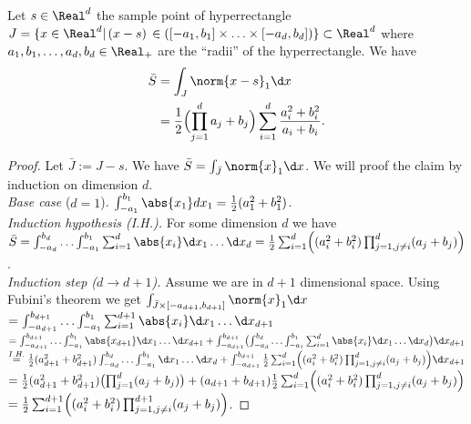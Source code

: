 \begin{lem} \label{lem:defint_of_1norm}
Let $s \in \Real^d$ the sample point of hyperrectangle $J = \{ x \in \Real^d \vert \,(x-s)\, \in ([-a_1,b_1] \times \ldots \times [-a_d,b_d])\}\subset \Real^d$ where $a_1,b_1,\ldots,a_d,b_d \in \Real_+$ are the ``radii'' of the hyperrectangle.
We have 
\begin{align}
\bar S  &= \int_{J} \norm{x-s}_1 \d x \\
& =  \frac{1}{2} \Bigl( \prod_{j=1}^d a_j + b_j\Bigr)  \sum_{i=1}^d \frac{a_i^2+b_i^2}{a_i + b_i}  .
\end{align}



\begin{proof}
Let $\bar J := J - s$.
We have $\bar S= \int_{\bar J} \norm{x}_1 \d x$.
We will proof the claim by induction on dimension $d$. \\
%
\textit{Base case} ($d=1$). $\int_{-a_1}^{b_1} \abs{x_1} dx_1 = \frac{1}{2} (a_1^2+b_1^2)$.\\
%
\textit{Induction hypothesis (I.H.).} For some dimension $d$ we have $ \bar S = \int_{-a_{d}}^{b_{d}}  \ldots \int_{-a_{1}}^{b_{1}}  \sum_{i=1}^{d} \abs{x_i} \d x_1 \ldots \d x_{d} =  \frac{1}{2} \sum_{i=1}^d  \Bigl( (a_i^2+b_i^2) \prod_{j=1,j\neq i}^d (a_j + b_j) \Bigr)$.\\
%
\textit{Induction step ($d \to d+1$).} Assume we are in $d+1$ dimensional space. 
Using Fubini's theorem we get 
$\int_{\bar J \times [-a_{d+1},b_{d+1}]} \norm{x}_1 \d x$
%
$ = \int_{-a_{d+1}}^{b_{d+1}}\ldots \int_{-a_{1}}^{b_{1}} \sum_{i=1}^{d+1} \abs{x_i} \d x_1 \ldots \d x_{d+1}$
%
$ = \int_{-a_{d+1}}^{b_{d+1}}\ldots \int_{-a_{1}}^{b_{1}}  \abs{x_{d+1}} \d x_1 \ldots \d x_{d+1} +  \int_{-a_{d+1}}^{b_{d+1}} \bigl( \int_{-a_{d}}^{b_{d}}  
\ldots \int_{-a_{1}}^{b_{1}}  \sum_{i=1}^{d} \abs{x_i} \d x_1 \ldots \d x_{d} \bigr) \d x_{d+1}$ 
%
$ \stackrel{I.H.}{=}   \frac{1}{2} (a_{d+1}^2 +b_{d+1}^2) \int_{-a_{d}}^{b_{d}}\ldots \int_{-a_{1}}^{b_{1}}  \d x_1 \ldots \d x_{d} +  \int_{-a_{d+1}}^{b_{d+1}} \frac{1}{2} \sum_{i=1}^d  \Bigl( (a_i^2+b_i^2) \prod_{j=1,j\neq i}^d (a_j + b_j) \Bigr) \d x_{d+1} $ 
%
$ =   \frac{1}{2} (a_{d+1}^2 +b_{d+1}^2) \bigl(\prod_{j=1}^d (a_j+b_j)\bigr) + (a_{d+1}+ b_{d+1} ) \frac{1}{2} \sum_{i=1}^d  \Bigl( (a_i^2+b_i^2) \prod_{j=1,j\neq i}^d (a_j + b_j) \Bigr) $ 
%
$  =\frac{1}{2} \sum_{i=1}^{d+1}  \Bigl( (a_i^2+b_i^2) \prod_{j=1,j\neq i}^{d+1} (a_j + b_j) \Bigr) $. 

\end{proof}
\end{lem}


